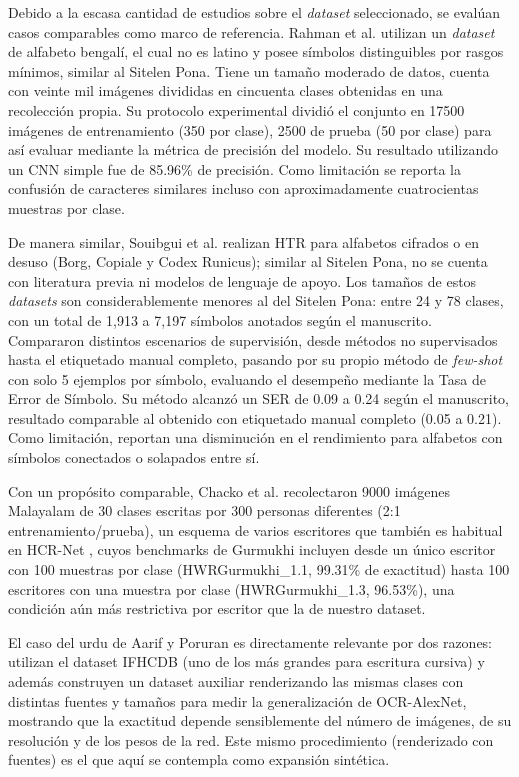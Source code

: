 \documentclass[conference]{IEEEtran}
\begin{document}
Debido a la escasa cantidad de estudios sobre el \textit{dataset} seleccionado, se evalúan casos comparables como marco de referencia. 
Rahman et al. \cite{bangla_cnn_2015} utilizan un \textit{dataset} de alfabeto bengalí, el cual no es latino y posee símbolos distinguibles por rasgos mínimos, similar al Sitelen Pona. Tiene un tamaño moderado de datos, cuenta con veinte mil imágenes divididas en cincuenta clases obtenidas en una recolección propia. Su protocolo experimental dividió el conjunto en 17500 imágenes de entrenamiento (350 por clase), 2500 de prueba (50 por clase) para así evaluar mediante la métrica de precisión del modelo. Su resultado utilizando un CNN simple fue de 85.96\% de precisión. Como limitación se reporta la confusión de caracteres similares incluso con aproximadamente cuatrocientas muestras por clase.

De manera similar, Souibgui et al. \cite{souibgui_few_2022} realizan HTR para alfabetos cifrados o en desuso (Borg, Copiale y Codex Runicus); similar al Sitelen Pona, no se cuenta con literatura previa ni modelos de lenguaje de apoyo. Los tamaños de estos \textit{datasets} son considerablemente menores al del Sitelen Pona: entre 24 y 78 clases, con un total de 1{,}913 a
7{,}197 símbolos anotados según el manuscrito. Compararon distintos escenarios de supervisión, desde métodos no supervisados hasta el etiquetado manual completo, pasando por su propio método de \textit{few-shot} con solo 5 ejemplos por símbolo, evaluando el desempeño mediante la Tasa de
Error de Símbolo. Su método alcanzó un SER de 0.09 a 0.24 según el manuscrito, resultado comparable al obtenido con etiquetado manual completo (0.05 a 0.21). Como limitación, reportan una disminución en el rendimiento para alfabetos con símbolos conectados o solapados entre sí.

Con un propósito comparable, Chacko et al. \cite{chacko_wavelet_2012} recolectaron 9000 imágenes Malayalam de 30 clases escritas por 300 personas diferentes (2:1 entrenamiento/prueba), un esquema de varios escritores que también es habitual en HCR-Net \cite{hcrnet_2024}, cuyos benchmarks de Gurmukhi incluyen desde un único escritor con 100 muestras por clase (HWRGurmukhi\_1.1, 99.31\% de exactitud) hasta 100 escritores con una muestra por clase (HWRGurmukhi\_1.3, 96.53\%), una condición aún más restrictiva por escritor que la de nuestro dataset.

El caso del urdu de Aarif y Poruran \cite{ocrnets_2020} es directamente relevante por dos razones: utilizan el dataset IFHCDB (uno de los más grandes para escritura cursiva) y además construyen un dataset auxiliar renderizando las mismas clases con distintas fuentes y tamaños para medir la generalización de OCR-AlexNet, mostrando que la exactitud depende sensiblemente del número de imágenes, de su resolución y de los pesos de la red. Este mismo procedimiento (renderizado con fuentes) es el que aquí se contempla como expansión sintética.
\end{document}
